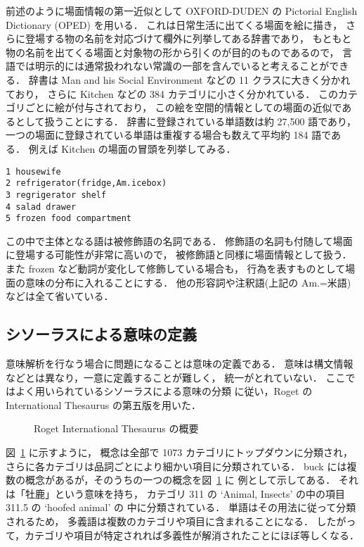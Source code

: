前述のように場面情報の第一近似として OXFORD-DUDEN の 
Pictorial English Dictionary (OPED) を用いる．
これは日常生活に出てくる場面を絵に描き，
さらに登場する物の名前を対応づけて欄外に列挙してある辞書であり，
もともと物の名前を出てくる場面と対象物の形から引くのが目的のものであるので，
言語では明示的には通常扱われない常識の一部を含んでいると考えることができる．
辞書は Man and his Social Environment などの 11 クラスに大きく分かれており，
さらに Kitchen などの 384 カテゴリに小さく分かれている．
このカテゴリごとに絵が付与されており，
この絵を空間的情報としての場面の近似であるとして扱うことにする．
辞書に登録されている単語数は約 27,500 語であり，
一つの場面に登録されている単語は重複する場合も数えて平均約 184 語である．
例えば Kitchen の場面の冒頭を列挙してみる．
{ \baselineskip=16pt
\begin{verbatim}
1 housewife
2 refrigerator(fridge,Am.icebox)
3 regrigerator shelf
4 salad drawer
5 frozen food compartment
\end{verbatim}
}
この中で主体となる語は被修飾語の名詞である．
修飾語の名詞も付随して場面に登場する可能性が非常に高いので，
被修飾語と同様に場面情報として扱う．
また frozen など動詞が変化して修飾している場合も，
行為を表すものとして場面の意味の分布に入れることにする．
他の形容詞や注釈語(上記の Am.=米語)などは全て省いている．

\subsection{シソーラスによる意味の定義}

意味解析を行なう場合に問題になることは意味の定義である．
意味は構文情報などとは異なり，一意に定義することが難しく，
統一がとれていない．
ここではよく用いられているシソーラスによる意味の分類\cite{Yarowsky92}
に従い，Roget の International Thesaurus の第五版を用いた．
\begin{figure}
  \begin{center}
  \end{center}
  \caption{Roget International Thesaurus の概要}
  \label{thesaurus}
\end{figure}
図~\ref{thesaurus} に示すように，
概念は全部で 1073 カテゴリにトップダウンに分類され，
さらに各カテゴリは品詞ごとにより細かい項目に分類されている．
buck には複数の概念があるが，そのうちの一つの概念を図~\ref{thesaurus} に
例として示してある．
それは「牡鹿」という意味を持ち，
カテゴリ 311 の `Animal, Insects' の中の項目 311.5 の `hoofed animal' の
中に分類されている．
単語はその用法に従って分類されるため，
多義語は複数のカテゴリや項目に含まれることになる．
したがって，カテゴリや項目が特定されれば多義性が解消されたことにほぼ等しくなる．

